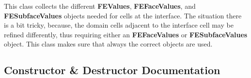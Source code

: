 This class collects the different {\bf F\+E\+Values}, {\bf F\+E\+Face\+Values}, and {\bf F\+E\+Subface\+Values} objects needed for cells at the interface. The situation there is a bit tricky, because, the domain cells adjacent to the interface cell may be refined differently, thus requiring either an {\bf F\+E\+Face\+Values} or {\bf F\+E\+Subface\+Values} object. This class makes sure that always the correct objects are used. 

\subsection{Constructor \& Destructor Documentation}
